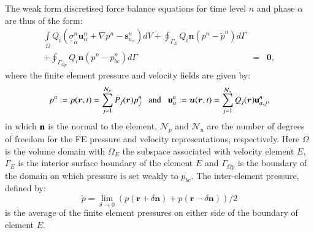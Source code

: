 \documentclass[preprint,authoryear,12pt]{elsarticle}
\begin{document}
The weak form discretised force balance equations for time level $n$
and phase $\alpha$ are thus of the form:
\begin{eqnarray} 
  \left. \int\limits_{\Omega} { {Q}}_i \left({\underline {\underline \sigma}}_\alpha^{n}  {\mathbf u}^{n}_\alpha + \nabla p^{n} -{\mathbf s}_{u_\alpha}^{n} \right) dV \right. +  \oint_{\Gamma_{E}}  {Q}_i {\mathbf n} \left(p^{n} - \tilde{p}^{n}\right) d\Gamma  \nonumber \\
  + \oint_{\Gamma_{\Omega p}} { Q}_i {\mathbf n} \left(p^{n} - p_{bc}^{n}\right) d\Gamma &=& \bm{0},
  \label{force-semi-disc} 
\end{eqnarray} 
where the finite element pressure and velocity fields are given by:
\begin{displaymath}
p^{n}:=p(\bm{r},t)=\sum\limits_{j=1}^{\mathcal{N}_p} P_{j}(\bm{r}) p_{j}^{n} \;\;\text{  and  }\;\; {\bf u}_\alpha^{n}:=\bm{u} (\bm{r},t) =\sum\limits_{j=1}^{\mathcal{N}_u} Q_{j}(\bm{r}){\bf u}_{\alpha,j}^{n},
\end{displaymath} 
in which $\bf {n}$ is the normal to the element, $\mathcal{N}_{p}$ and
$\mathcal{N}_{u}$ are the number of degrees of freedom for the FE
pressure and velocity representations, respectively. Here $\Omega$
is the volume domain with $\Omega_E$ the subspace associated with
velocity element $E$, $\Gamma_{E}$ is the interior surface boundary of
the element $E$ and $\Gamma_{\Omega p}$ is the boundary of the domain
on which pressure is set weakly to $p_{bc}$. The inter-element
pressure, defined by:
\[\tilde{p}=\lim_{\delta\rightarrow 0}(p(\bm{r}+\delta \mathbf{n})+p(\bm{r}-\delta \mathbf{n}))/2\] is the average of the finite element pressures on either side of the boundary of element $E$. 
\end{document}
